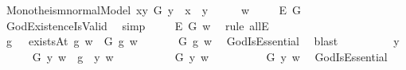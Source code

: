 \begin{isabellebody}
\begin{isamarkuptext}
\end{isamarkuptext}\isamarkuptrue%
\isamarkupfalse%
\ Monotheism{\isacharunderscore}normalModel{\isacharcolon}\ {\isachardoublequoteopen}{\isasymlfloor}\isactrlbold {\isasymexists}x{\isachardot}\isactrlbold {\isasymforall}y{\isachardot}\ G\ y\ \isactrlbold {\isasymleftrightarrow}\ x\ \isactrlbold {\isasymapprox}\ y{\isasymrfloor}{\isachardoublequoteclose}\isanewline
%
\isadelimproof
%
\endisadelimproof
%
\isatagproof
{}\isamarkupfalse%
\ {\isacharminus}\isanewline
\isacommand{{\isacharbraceleft}}\isamarkupfalse%
\isanewline
\ \ \isamarkupfalse%
\ w\ \isanewline
\ \ \isamarkupfalse%
\ {\isachardoublequoteopen}{\isasymlfloor}\isactrlbold {\isasymexists}\isactrlsup E\ G{\isasymrfloor}{\isachardoublequoteclose}\ \isamarkupfalse%
\ GodExistenceIsValid\ \isamarkupfalse%
\ simp\ %
\isanewline
\ \ \isamarkupfalse%
\ {\isachardoublequoteopen}{\isacharparenleft}\isactrlbold {\isasymexists}\isactrlsup E\ G{\isacharparenright}\ w{\isachardoublequoteclose}\ \isamarkupfalse%
\ {\isacharparenleft}rule\ allE{\isacharparenright}\ \ \ \ \ \ \ \isanewline
\ \ \isamarkupfalse%
\ \isamarkupfalse%
\ g\ \ {}{\isacharcolon}\ {\isachardoublequoteopen}existsAt\ g\ w\ {\isasymand}\ G\ g\ w{\isachardoublequoteclose}\ \isacommand{{\isachardot}{\isachardot}}\isamarkupfalse%
\isanewline
\ \ \isamarkupfalse%
\ {}{\isacharcolon}\ {\isachardoublequoteopen}{\isasymE}\ G\ g\ w{\isachardoublequoteclose}\ \isamarkupfalse%
\ GodIsEssential\ \isamarkupfalse%
\ blast\ %
\isanewline
\ \ \isacommand{{\isacharbraceleft}}\isamarkupfalse%
\isanewline
\ \ \ \ \isamarkupfalse%
\ y\isanewline
\ \ \ \ \isamarkupfalse%
\ {\isachardoublequoteopen}G\ y\ w\ {\isasymlongleftrightarrow}\ {\isacharparenleft}g\ \isactrlbold {\isasymapprox}\ y{\isacharparenright}\ w{\isachardoublequoteclose}\ \isamarkupfalse%
\ \isanewline
\ \ \ \ \ \ \isamarkupfalse%
\ {\isachardoublequoteopen}G\ y\ w{\isachardoublequoteclose}\isanewline
\ \ \ \ \ \ \isamarkupfalse%
\ {}{\isacharcolon}\ {\isachardoublequoteopen}{\isasymE}\ G\ y\ w{\isachardoublequoteclose}\ \isamarkupfalse%
\ GodIsEssential\ \isamarkupfalse%

\end{isabellebody}
